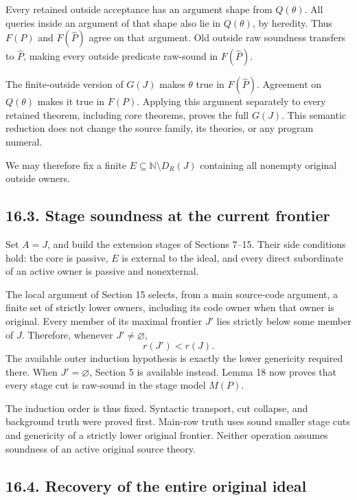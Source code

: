 \documentclass[
  11pt,
  letterpaper,
]{article}
\newcounter{none} %
\begin{document}
Every retained outside acceptance has an argument shape from
\(Q(\theta)\). All queries inside an argument of that shape also lie in
\(Q(\theta)\), by heredity. Thus \(F(P)\) and \(F(\widehat P)\) agree on
that argument. Old outside raw soundness transfers to \(\widehat P\),
making every outside predicate raw-sound in \(F(\widehat P)\).

The finite-outside version of \(G(J)\) makes \(\theta\) true in
\(F(\widehat P)\). Agreement on \(Q(\theta)\) makes it true in \(F(P)\).
Applying this argument separately to every retained theorem, including
core theorems, proves the full \(G(J)\). This semantic reduction does
not change the source family, its theories, or any program numeral.

We may therefore fix a finite \(E\subseteq\mathbb N\setminus D_R(J)\)
containing all nonempty original outside owners.

\subsection{16.3. Stage soundness at the current
frontier}\label{stage-soundness-at-the-current-frontier}

Set \(A=J\), and build the extension stages of Sections 7--15. Their
side conditions hold: the core is passive, \(E\) is external to the
ideal, and every direct subordinate of an active owner is passive and
nonexternal.

The local argument of Section 15 selects, from a main source-code
argument, a finite set of strictly lower owners, including its code
owner when that owner is original. Every member of its maximal frontier
\(J'\) lies strictly below some member of \(J\). Therefore, whenever
\(J'\ne\varnothing\), \[
r(J')<r(J).
\] The available outer induction hypothesis is exactly the lower
genericity required there. When \(J'=\varnothing\), Section 5 is
available instead. Lemma 18 now proves that every stage cut is raw-sound
in the stage model \(M(P)\).

The induction order is thus fixed. Syntactic transport, cut collapse,
and background truth were proved first. Main-row truth uses sound
smaller stage cuts and genericity of a strictly lower original frontier.
Neither operation assumes soundness of an active original source theory.

\subsection{16.4. Recovery of the entire original
ideal}\label{recovery-of-the-entire-original-ideal}
\end{document}
